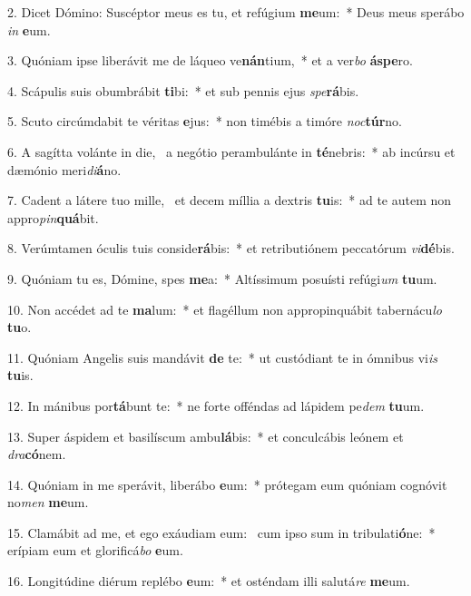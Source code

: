 2. Dicet Dómino: Suscéptor meus es tu, et refúgium \textbf{me}um:~*  Deus meus sperábo \textit{in} \textbf{e}um.\

3. Quóniam ipse liberávit me de láqueo ve\textbf{nán}tium,~*  et a ver\textit{bo} \textbf{ás}\textbf{pe}ro.\

4. Scápulis suis obumbrábit \textbf{ti}bi:~*  et sub pennis ejus \textit{spe}\textbf{rá}bis.\

5. Scuto circúmdabit te véritas \textbf{e}jus:~*  non timébis a timóre \textit{noc}\textbf{túr}no.\

6. A sagítta volánte in die, \dag\  a negótio perambulánte in \textbf{té}nebris:~*  ab incúrsu et dæmónio meri\textit{di}\textbf{á}no.\

7. Cadent a látere tuo mille, \dag\  et decem míllia a dextris \textbf{tu}is:~*  ad te autem non appro\textit{pin}\textbf{quá}bit.\

8. Verúmtamen óculis tuis conside\textbf{rá}bis:~*  et retributiónem peccatórum \textit{vi}\textbf{dé}bis.\

9. Quóniam tu es, Dómine, spes \textbf{me}a:~*  Altíssimum posuísti refúgi\textit{um} \textbf{tu}um.\

10. Non accédet ad te \textbf{ma}lum:~*  et flagéllum non appropinquábit tabernácu\textit{lo} \textbf{tu}o.\

11. Quóniam Angelis suis mandávit \textbf{de} te:~*  ut custódiant te in ómnibus vi\textit{is} \textbf{tu}is.\

12. In mánibus por\textbf{tá}bunt te:~*  ne forte offéndas ad lápidem pe\textit{dem} \textbf{tu}um.\

13. Super áspidem et basilíscum ambu\textbf{lá}bis:~*  et conculcábis leónem et \textit{dra}\textbf{có}nem.\

14. Quóniam in me sperávit, liberábo \textbf{e}um:~*  prótegam eum quóniam cognóvit no\textit{men} \textbf{me}um.\

15. Clamábit ad me, et ego exáudiam eum: \dag\  cum ipso sum in tribulati\textbf{ó}ne:~*  erípiam eum et glorificá\textit{bo} \textbf{e}um.\

16. Longitúdine diérum replébo \textbf{e}um:~*  et osténdam illi salutá\textit{re} \textbf{me}um.\

